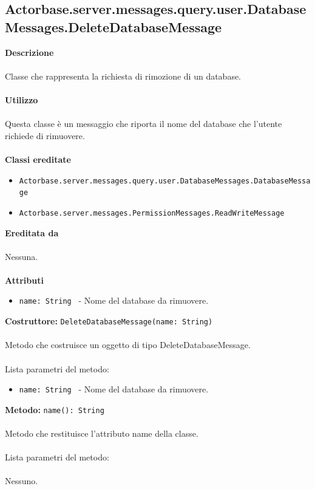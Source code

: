 \documentclass[a4paper]{article}
\begin{document}
	\subsection{Actorbase.server.messages.query.user.DatabaseMessages.DeleteDatabaseMessage}
		\textbf{Descrizione}
			\\ \\
		Classe che rappresenta la richiesta di rimozione di un database.
			\\ \\
		\textbf{Utilizzo}
			\\ \\
		Questa classe è un messaggio che riporta il nome del database che l'utente richiede di rimuovere.
			\\ \\
		\textbf{Classi ereditate}
			\begin{itemize}
				\item \texttt{Actorbase.server.messages.query.user.DatabaseMessages.DatabaseMessage }
				\item \texttt{Actorbase.server.messages.PermissionMessages.ReadWriteMessage }
			\end{itemize}
		\textbf{Ereditata da}
			\\ \\
			Nessuna.
			\\ \\
		\textbf{Attributi}
			\begin{itemize}
				\item \texttt{name: String } - Nome del database da rimuovere.
			\end{itemize}
		\textbf{Costruttore: }\texttt{DeleteDatabaseMessage(name: String)}
			\\ \\
		Metodo che costruisce un oggetto di tipo DeleteDatabaseMessage.
			\\ \\
		Lista parametri del metodo:
			\begin{itemize}
				\item \texttt{name: String } - Nome del database da rimuovere.
			\end{itemize}
		\textbf{Metodo: }\texttt{name(): String}
			\\ \\
		Metodo che restituisce l'attributo name della classe.
			\\ \\
		Lista parametri del metodo:
			\\ \\
			Nessuno.		
			
\end{document}
